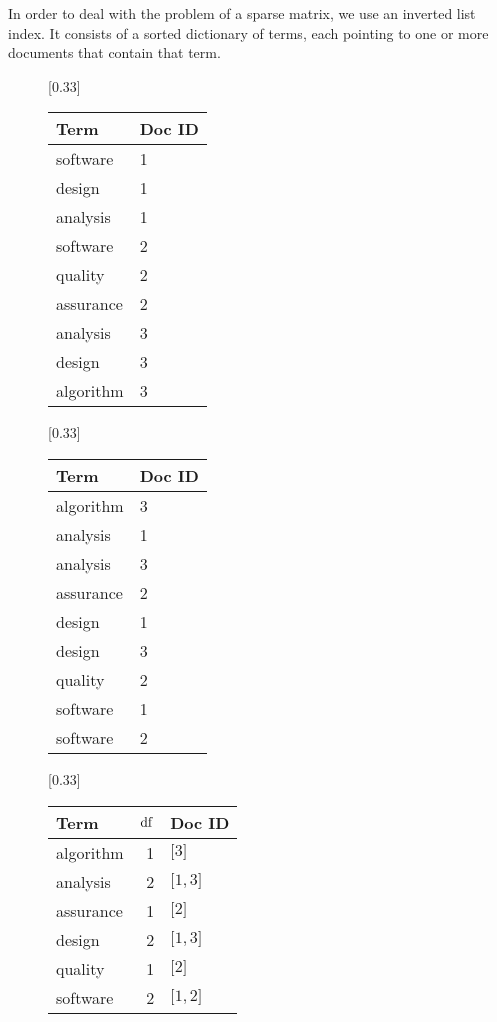 \begin{ex}
		In order to deal with the problem of a sparse matrix, we use an inverted list index.  It consists of a sorted dictionary of terms, each pointing to one or more documents that contain that term.
		
		\begin{figure}[!ht]
			\centering
			
			[0.33\textwidth]{
				\centering
				\begin{tabular}{ll}
					\toprule
					Term & Doc ID \\
					\midrule
					software & 1 \\
					design & 1 \\
					analysis & 1 \\
					software & 2 \\
					quality & 2 \\
					assurance & 2 \\
					analysis & 3 \\
					design & 3 \\
					algorithm & 3 \\
					\bottomrule
				\end{tabular}
			}
			[0.33\textwidth]{
				\centering
				\begin{tabular}{ll}
					\toprule
					Term & Doc ID \\
					\midrule
					algorithm & 3 \\
					analysis & 1 \\
					analysis & 3 \\
					assurance & 2 \\
					design & 1 \\
					design & 3 \\
					quality & 2 \\
					software & 1 \\
					software & 2 \\
					\bottomrule
				\end{tabular}
			}
			[0.33\textwidth]{
				\centering
				\begin{tabular}{lrl}
					\toprule
					Term & $\operatorname{df}$ & Doc ID \\
					\midrule
					algorithm & 1 & $\lbrack 3\rbrack$ \\
					analysis & 2 & $\lbrack 1, 3\rbrack$ \\
					assurance & 1 & $\lbrack 2\rbrack$ \\
					design & 2 & $\lbrack 1, 3\rbrack$ \\
					quality & 1 & $\lbrack 2\rbrack$ \\
					software & 2 & $\lbrack 1, 2\rbrack$ \\
					\bottomrule
				\end{tabular}
			}
			

\end{figure}
\end{ex}
